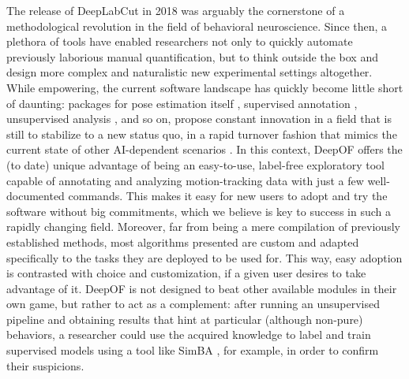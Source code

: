 The release of DeepLabCut in 2018 was arguably the cornerstone of a methodological revolution in the field of behavioral neuroscience. Since then, a plethora of tools have enabled researchers not only to quickly automate previously laborious manual quantification, but to think outside the box and design more complex and naturalistic new experimental settings altogether. While empowering, the current software landscape has quickly become little short of daunting: packages for pose estimation itself \cite{Mathis2018DeepLabCut:Learning, Pereira2022SLEAP:Tracking}, supervised annotation \cite{Ro2020SimpleAnimals, Schweihoff2022A-SOiDBehavior}, unsupervised analysis \cite{Hsu2021B-SOiDBehaviors, Weinreb2023Keypoint-MoSeq:Dynamics, Luxem2022IdentifyingMotion}, and so on, propose constant innovation in a field that is still to stabilize to a new status quo, in a rapid turnover fashion that mimics the current state of other AI-dependent scenarios \cite{Shao2022TracingTrends}.
In this context, DeepOF offers the (to date) unique advantage of being an easy-to-use, label-free exploratory tool capable of annotating and analyzing motion-tracking data with just a few well-documented commands. This makes it easy for new users to adopt and try the software without big commitments, which we believe is key to success in such a rapidly changing field. Moreover, far from being a mere compilation of previously established methods, most algorithms presented are custom and adapted specifically to the tasks they are deployed to be used for. This way, easy adoption is contrasted with choice and customization, if a given user desires to take advantage of it. DeepOF is not designed to beat other available modules in their own game, but rather to act as a complement: after running an unsupervised pipeline and obtaining results that hint at particular (although non-pure) behaviors, a researcher could use the acquired knowledge to label and train supervised models using a tool like SimBA \cite{Ro2020SimpleAnimals}, for example, in order to confirm their suspicions.


